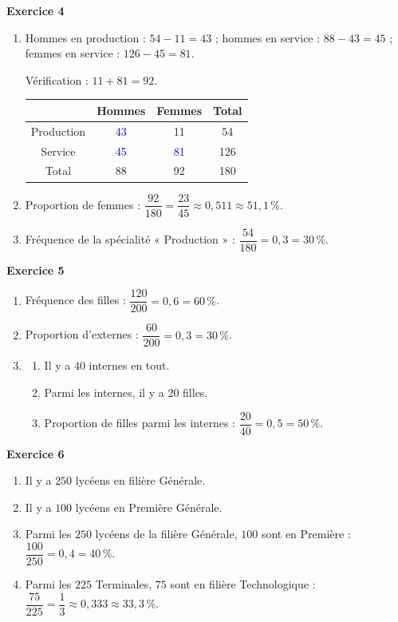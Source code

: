 \documentclass[a4paper,11pt]{article}
\newenvironment{exercice}[1]{%
  \Needspace{6\baselineskip}\par\bigskip\noindent\textbf{Exercice #1}\par\smallskip\noindent\ignorespaces
}{%
  \par
}
\newcommand{\val}[1]{\textcolor{blue}{#1}}
\begin{document}
\begin{exercice}{4}
\begin{enumerate}[label=\arabic*.]
\item Hommes en production : $54-11=43$ ; hommes en service : $88-43=45$ ; femmes en service : $126-45=81$.

Vérification : $11+81=92$.

\begin{center}
\begin{tabular}{|c|c|c|c|}
\hline
 & Hommes & Femmes & Total \\ \hline
Production & \val{43} & 11 & 54 \\ \hline
Service & \val{45} & \val{81} & 126 \\ \hline
Total & 88 & 92 & 180 \\ \hline
\end{tabular}
\end{center}
\item Proportion de femmes : $\dfrac{92}{180}=\dfrac{23}{45}\approx 0{,}511\approx 51{,}1\,\%$.
\item Fréquence de la spécialité « Production » : $\dfrac{54}{180}=0{,}3=30\,\%$.
\end{enumerate}
\end{exercice}

\begin{exercice}{5}
\begin{enumerate}[label=\arabic*.]
\item Fréquence des filles : $\dfrac{120}{200}=0{,}6=60\,\%$.
\item Proportion d'externes : $\dfrac{60}{200}=0{,}3=30\,\%$.
\item
\begin{enumerate}[label=(\alph*)]
\item Il y a $40$ internes en tout.
\item Parmi les internes, il y a $20$ filles.
\item Proportion de filles parmi les internes : $\dfrac{20}{40}=0{,}5=50\,\%$.
\end{enumerate}
\end{enumerate}
\end{exercice}

\begin{exercice}{6}
\begin{enumerate}[label=\arabic*.]
\item Il y a $250$ lycéens en filière Générale.
\item Il y a $100$ lycéens en Première Générale.
\item Parmi les $250$ lycéens de la filière Générale, $100$ sont en Première : $\dfrac{100}{250}=0{,}4=40\,\%$.
\item Parmi les $225$ Terminales, $75$ sont en filière Technologique : $\dfrac{75}{225}=\dfrac{1}{3}\approx 0{,}333\approx 33{,}3\,\%$.
\end{enumerate}
\end{exercice}
\end{document}
